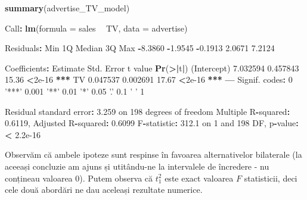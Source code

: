 \documentclass[]{article}
\newenvironment{Shaded}{\begin{snugshade}}{\end{snugshade}}
\newcommand{\KeywordTok}[1]{\textcolor[rgb]{0.13,0.29,0.53}{\textbf{#1}}}
\newcommand{\DataTypeTok}[1]{\textcolor[rgb]{0.13,0.29,0.53}{#1}}
\newcommand{\DecValTok}[1]{\textcolor[rgb]{0.00,0.00,0.81}{#1}}
\newcommand{\FloatTok}[1]{\textcolor[rgb]{0.00,0.00,0.81}{#1}}
\newcommand{\StringTok}[1]{\textcolor[rgb]{0.31,0.60,0.02}{#1}}
\newcommand{\OperatorTok}[1]{\textcolor[rgb]{0.81,0.36,0.00}{\textbf{#1}}}
\newcommand{\ErrorTok}[1]{\textcolor[rgb]{0.64,0.00,0.00}{\textbf{#1}}}
\newcommand{\NormalTok}[1]{#1}
\begin{document}
\begin{Shaded}
\begin{Highlighting}[]
\KeywordTok{summary}\NormalTok{(advertise_TV_model)}

\NormalTok{Call}\OperatorTok{:}
\KeywordTok{lm}\NormalTok{(}\DataTypeTok{formula =}\NormalTok{ sales }\OperatorTok{~}\StringTok{ }\NormalTok{TV, }\DataTypeTok{data =}\NormalTok{ advertise)}

\NormalTok{Residuals}\OperatorTok{:}
\StringTok{    }\NormalTok{Min      1Q  Median      3Q     Max }
\OperatorTok{-}\FloatTok{8.3860} \OperatorTok{-}\FloatTok{1.9545} \OperatorTok{-}\FloatTok{0.1913}  \FloatTok{2.0671}  \FloatTok{7.2124} 

\NormalTok{Coefficients}\OperatorTok{:}
\StringTok{            }\NormalTok{Estimate Std. Error t value }\KeywordTok{Pr}\NormalTok{(}\OperatorTok{>}\ErrorTok{|}\NormalTok{t}\OperatorTok{|}\NormalTok{)    }
\NormalTok{(Intercept) }\FloatTok{7.032594}   \FloatTok{0.457843}   \FloatTok{15.36}   \OperatorTok{<}\FloatTok{2e-16} \OperatorTok{**}\ErrorTok{*}
\NormalTok{TV          }\FloatTok{0.047537}   \FloatTok{0.002691}   \FloatTok{17.67}   \OperatorTok{<}\FloatTok{2e-16} \OperatorTok{**}\ErrorTok{*}
\OperatorTok{---}
\NormalTok{Signif. codes}\OperatorTok{:}\StringTok{  }\DecValTok{0} \StringTok{'***'} \FloatTok{0.001} \StringTok{'**'} \FloatTok{0.01} \StringTok{'*'} \FloatTok{0.05} \StringTok{'.'} \FloatTok{0.1} \StringTok{' '} \DecValTok{1}

\NormalTok{Residual standard error}\OperatorTok{:}\StringTok{ }\FloatTok{3.259}\NormalTok{ on }\DecValTok{198}\NormalTok{ degrees of freedom}
\NormalTok{Multiple R}\OperatorTok{-}\NormalTok{squared}\OperatorTok{:}\StringTok{  }\FloatTok{0.6119}\NormalTok{,    Adjusted R}\OperatorTok{-}\NormalTok{squared}\OperatorTok{:}\StringTok{  }\FloatTok{0.6099} 
\NormalTok{F}\OperatorTok{-}\NormalTok{statistic}\OperatorTok{:}\StringTok{ }\FloatTok{312.1}\NormalTok{ on }\DecValTok{1}\NormalTok{ and }\DecValTok{198}\NormalTok{ DF,  p}\OperatorTok{-}\NormalTok{value}\OperatorTok{:}\StringTok{ }\ErrorTok{<}\StringTok{ }\FloatTok{2.2e-16}
\end{Highlighting}
\end{Shaded}

Observăm că ambele ipoteze sunt respinse în favoarea alternativelor
bilaterale (la aceeași concluzie am ajuns și utitându-ne la intervalele
de încredere - nu conțineau valoarea \(0\)). Putem observa că \(t_1^2\)
este exact valoarea \(F\) statisticii, deci cele două abordări ne dau
aceleași rezultate numerice.
\end{document}

